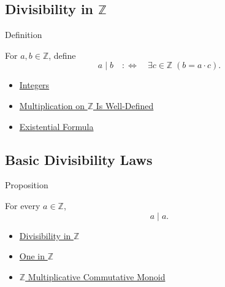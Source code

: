 \subsection*{\texorpdfstring{Divisibility in $\mathbb{Z}$}{Divisibility in Z}}

\begin{definitionbox}{Definition}
\begin{definition}
\label{def:divisibility-in-z}
For $a,b\in\mathbb{Z}$, define
\[
a\mid b
\quad:\Longleftrightarrow\quad
\exists c\in\mathbb{Z}\;(b=a\cdot c).
\]
\end{definition}
\end{definitionbox}

\begin{dependencies}
\begin{itemize}
  \item \hyperref[def:integers]{Integers}
  \item \hyperref[thm:multiplication-on-z-well-defined]{Multiplication on $\mathbb{Z}$ Is Well-Defined}
  \item \hyperref[def:existential-q]{Existential Formula}
\end{itemize}
\end{dependencies}

\subsection*{Basic Divisibility Laws}

\begin{propositionbox}{Proposition}
\begin{proposition}
\label{prop:divisibility-reflexive-on-z}
For every $a\in\mathbb{Z}$,
\[
a\mid a.
\]
\end{proposition}
\end{propositionbox}

\begin{dependencies}
\begin{itemize}
  \item \hyperref[def:divisibility-in-z]{Divisibility in $\mathbb{Z}$}
  \item \hyperref[def:one-in-z]{One in $\mathbb{Z}$}
  \item \hyperref[thm:z-multiplicative-commutative-monoid]{$\mathbb{Z}$ Multiplicative Commutative Monoid}
\end{itemize}
\end{dependencies}

